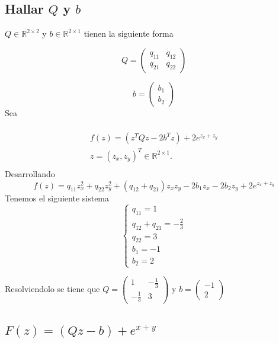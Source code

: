 \documentclass{endm}
\begin{document}
\subsection{Hallar $Q$ y $b$}
$Q \in \mathbb{R}^{2\times2}$ y $b \in \mathbb{R}^{2\times1}$ tienen la siguiente forma

\begin{equation}
    Q = \begin{pmatrix} q_{11} & q_{12} \\ q_{21} & q_{22} \end{pmatrix}
\end{equation}

\begin{equation}
    b = \begin{pmatrix} b_1 \\ b_2 \end{pmatrix}
\end{equation}
Sea

\begin{multline} 
   \\ f(z) = (z^{T}Qz - 2b^{T}z) + 2e^{z_x+z_y} \\
    z = (z_x,z_y)^T \in \mathbb{R}^{2\times1}.\\
\end{multline}
Desarrollando
\begin{equation}
    f(z) = q_{11}z_x^2 + q_{22}z_y^2 + (q_{12} + q_{21})z_x z_y - 2b_1 z_x - 2b_2z_y + 2e^{z_x+z_y}
\end{equation}
Tenemos el siguiente sistema
\begin{equation}
\begin{cases}
q_{11} = 1 \\
q_{12} + q_{21} = -\frac{2}{3} \\
q_{22} = 3 \\
b_1 = -1 \\
b_2 = 2
\end{cases}
\end{equation}

Resolviendolo se tiene que
$Q =  \begin{pmatrix} 1 & -\frac{1}{3} \\ -\frac{1}{3} & 3\end{pmatrix} $
y
$b = \begin{pmatrix} -1\\ 2 \end{pmatrix}$
\subsection{$F(z) = (Qz -b)+ e^{x+y}$}
\end{document}
